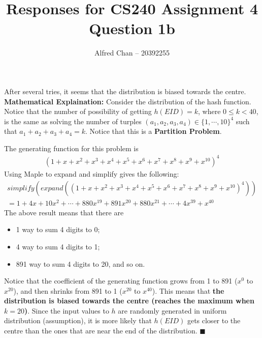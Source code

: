 \documentclass[12pt]{article}
\title{Responses for CS240 Assignment 4 Question 1b}
\author{Alfred Chan -- 20392255}
\begin{document}
\maketitle
After several tries, it seems that the distribution is biased towards the centre.\\

{\bf Mathematical Explaination:} Consider the distribution of the hash function.
Notice that the number of possibility of getting $h(EID) = k$,
where $0 \le k < 40$, is the same as solving the number of turples 
	$(a_1,a_2,a_3,a_4) \in \{1, \cdots, 10\}^4$ such that $a_1 + a_2 + a_3 + a_4 = k$.
Notice that this is a {\bf Partition Problem}.

The generating function for this problem is
\begin{align}
(1+x+x^2+x^3+x^4+x^5+x^6+x^7+x^8+x^9+x^{10})^4
\end{align}
Using Maple to expand and simplify gives the following:
\begin{gather*}
simplify(expand((1+x+x^2+x^3+x^4+x^5+x^6+x^7+x^8+x^9+x^10)^4))\\
= 1+4x+10x^2+ \cdots
	+ 880x^{19} + 891x^{20} + 880x^{21} + \cdots
	+ 4x^{39} + x^{40}
\end{gather*}
The above result means that there are
\begin{itemize}
\item 1 way to sum 4 digits to 0;
\item 4 way to sum 4 digits to 1;
\item 891 way to sum 4 digits to 20, and so on.
\end{itemize}

Notice that the coefficient of the generating function
	grows from 1 to 891 ($x^{0}$ to $x^{20}$),
	and then shrinks from 891 to 1 ($x^{20}$ to $x^{40}$).
This means that {\bf the distribution is biased towards the centre (reaches the maximum when $k=20$)}.
Since the input values to $h$ are randomly generated in uniform distribution (assumption),
it is more likely that $h(EID)$ gets closer to the centre than the ones that are near the end of the distribution.
\hfill $\blacksquare$
\end{document}
